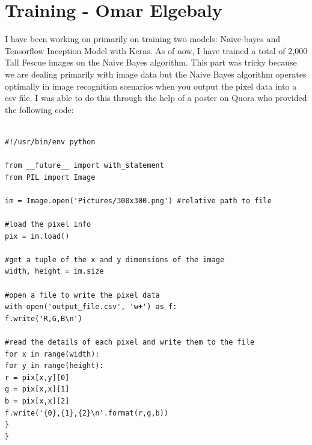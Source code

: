 \documentclass[onecolumn, draftclsnofoot,10pt, compsoc]{IEEEtran}
\begin{document}
\section{Training - Omar Elgebaly}
I have been working on primarily on training two models: Naive-bayes and Tensorflow Inception Model with Keras. As of now, I have trained a total of 2,000 Tall Fescue images on the Naive Bayes algorithm. This part was tricky because we are dealing primarily with image data but the Naive Bayes algorithm operates optimally in image recognition scenarios when you output the pixel data into a csv file. I was able to do this through the help of a poster on Quora who provided the following code: \begin{lstlisting}

#!/usr/bin/env python

from __future__ import with_statement
from PIL import Image

im = Image.open('Pictures/300x300.png') #relative path to file

#load the pixel info
pix = im.load()

#get a tuple of the x and y dimensions of the image
width, height = im.size

#open a file to write the pixel data
with open('output_file.csv', 'w+') as f:
f.write('R,G,B\n')

#read the details of each pixel and write them to the file
for x in range(width):
for y in range(height):
r = pix[x,y][0]
g = pix[x,x][1]
b = pix[x,x][2]
f.write('{0},{1},{2}\n'.format(r,g,b))
}    
}
\end{lstlisting}
\end{document}
